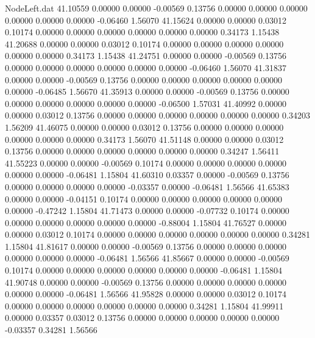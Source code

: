 \begin{filecontents}{NodeLeft.dat}
  41.10559    0.00000    0.00000    -0.00569    0.13756    0.00000    0.00000    0.00000    0.00000    0.00000    0.00000   -0.06460    1.56070
  41.15624    0.00000    0.00000     0.03012    0.10174    0.00000    0.00000    0.00000    0.00000    0.00000    0.00000    0.34173    1.15438
  41.20688    0.00000    0.00000     0.03012    0.10174    0.00000    0.00000    0.00000    0.00000    0.00000    0.00000    0.34173    1.15438
  41.24751    0.00000    0.00000    -0.00569    0.13756    0.00000    0.00000    0.00000    0.00000    0.00000    0.00000   -0.06460    1.56070
  41.31837    0.00000    0.00000    -0.00569    0.13756    0.00000    0.00000    0.00000    0.00000    0.00000    0.00000   -0.06485    1.56670
  41.35913    0.00000    0.00000    -0.00569    0.13756    0.00000    0.00000    0.00000    0.00000    0.00000    0.00000   -0.06500    1.57031
  41.40992    0.00000    0.00000     0.03012    0.13756    0.00000    0.00000    0.00000    0.00000    0.00000    0.00000    0.34203    1.56209
  41.46075    0.00000    0.00000     0.03012    0.13756    0.00000    0.00000    0.00000    0.00000    0.00000    0.00000    0.34173    1.56070
  41.51148    0.00000    0.00000     0.03012    0.13756    0.00000    0.00000    0.00000    0.00000    0.00000    0.00000    0.34247    1.56411
  41.55223    0.00000    0.00000    -0.00569    0.10174    0.00000    0.00000    0.00000    0.00000    0.00000    0.00000   -0.06481    1.15804
  41.60310    0.03357    0.00000    -0.00569    0.13756    0.00000    0.00000    0.00000    0.00000   -0.03357    0.00000   -0.06481    1.56566
  41.65383    0.00000    0.00000    -0.04151    0.10174    0.00000    0.00000    0.00000    0.00000    0.00000    0.00000   -0.47242    1.15804
  41.71473    0.00000    0.00000    -0.07732    0.10174    0.00000    0.00000    0.00000    0.00000    0.00000    0.00000   -0.88004    1.15804
  41.76527    0.00000    0.00000     0.03012    0.10174    0.00000    0.00000    0.00000    0.00000    0.00000    0.00000    0.34281    1.15804
  41.81617    0.00000    0.00000    -0.00569    0.13756    0.00000    0.00000    0.00000    0.00000    0.00000    0.00000   -0.06481    1.56566
  41.85667    0.00000    0.00000    -0.00569    0.10174    0.00000    0.00000    0.00000    0.00000    0.00000    0.00000   -0.06481    1.15804
  41.90748    0.00000    0.00000    -0.00569    0.13756    0.00000    0.00000    0.00000    0.00000    0.00000    0.00000   -0.06481    1.56566
  41.95828    0.00000    0.00000     0.03012    0.10174    0.00000    0.00000    0.00000    0.00000    0.00000    0.00000    0.34281    1.15804
  41.99911    0.00000    0.03357     0.03012    0.13756    0.00000    0.00000    0.00000    0.00000    0.00000   -0.03357    0.34281    1.56566

\end{filecontents}
